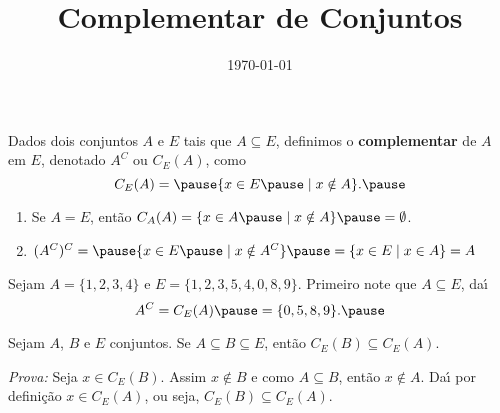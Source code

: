 \documentclass{beamer}
\title{Complementar de Conjuntos}
\author[\autor]{\autor}
\institute[\instituto]{\instituto}
\date{\today}
\begin{document}
    \begin{frame}
        \maketitle
    \end{frame}


    \begin{frame}
        \begin{definicao}
        Dados dois conjuntos $A$ e $E$ \pause tais que $A\subseteq E$, \pause definimos o \textbf{complementar} \pause de $A$ em $E$, denotado $A^C$ ou $C_E(A)$, como\pause
        \[
            C_E(A) = \pause \{ x \in E \pause \mid x \notin A \}.\pause
        \]
        \end{definicao}

        \begin{observacoes}
            \begin{enumerate}[label={\arabic*})]
                \item Se $A = E$, \pause ent{\~a}o $C_A(A) = \{ x \in A \pause \mid x \notin A \} \pause = \emptyset$.\pause
                \item $(A^C)^C = \pause \{x \in E \pause \mid x \notin A^C\} \pause = \{ x \in E \mid x \in A \} = A$\pause
            \end{enumerate}
            
        \end{observacoes}
    \end{frame}

    \begin{frame}
        \begin{exemplo}
            Sejam $A = \{1,2,3,4\}$ \pause e $E = \{1,2,3,5,4,0,8,9\}$. \pause Primeiro note que $A \subseteq E$, \pause da{\'\i}
            \[
                    A^C = C_E(A) \pause = \{0,5,8,9\}.\pause
            \]
        \end{exemplo}
    
        \begin{proposicao}
            Sejam $A$, $B$ e $E$ conjuntos. \pause Se $A\subseteq B\subseteq E$, \pause ent{\~a}o $C_E(B)\subseteq C_E(A)$.\pause
        \end{proposicao}
        \textit{Prova: }\pause
            Seja $x \in C_E(B)$. \pause Assim $x\notin B$ \pause e como $A \subseteq B$, \pause ent\~ao $x \notin A$. \pause Da{\'\i} por defini\c{c}\~ao $x\in C_E(A)$, \pause ou seja, $C_E(B) \subseteq C_E(A)$.\qedsymbol\pause
    \end{frame}
\end{document}
